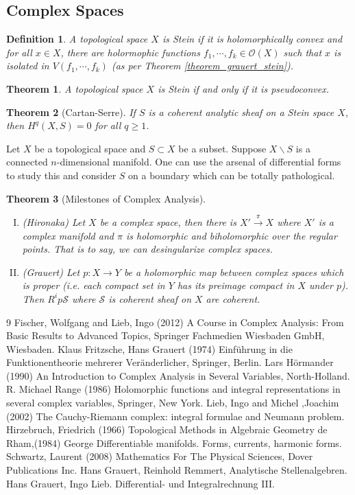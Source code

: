 \documentclass{article}
\newtheorem{theorem}{Theorem} [section]
\newtheorem{definition}{Definition}[section]
\newcommand{\Ouv}[0]{\mathcal{O}}
\begin{document}
    \subsection{Complex Spaces}
    \begin{definition}
      A topological space $X$ is Stein if it is holomorphically convex and for all $x\in X$, there are holormophic functions $f_1,\cdots,f_k\in\Ouv(X)$ such that $x$ is isolated in $V(f_1,\cdots,f_k)$ (as per Theorem \ref{theorem_grauert_stein}).
    \end{definition}
    \begin{theorem}
      A topological space $X$ is Stein if and only if it is pseudoconvex.
    \end{theorem}
    \begin{theorem}[Cartan-Serre]
      If $S$ is a coherent analytic sheaf on a Stein space $X$, then $H^q(X,S)=0$ for all $q\geq1$.
    \end{theorem}
    Let $X$ be a topological space and $S\subset X$ be a subset. Suppose $X\backslash S$ is a connected $n$-dimensional manifold. One can use the arsenal of differential forms to study this and consider $S$ on a boundary which can be totally pathological.
    \begin{theorem}[Milestones of Complex Analysis]$\:$
      \begin{enumerate}[I).]
        \item (Hironaka) Let $X$ be a complex space, then there is $X'\stackrel{\pi}{\to}X$ where $X'$ is a complex manifold and $\pi$ is holomorphic and biholomorphic over the regular points. That is to say, we can desingularize complex spaces.
        \item (Grauert) Let $p:X\to Y$ be a holomorphic map between complex spaces which is proper (i.e. each compact set in $Y$ has its preimage compact in $X$ under $p$). Then $R^ip\mathcal{S}$ where $\mathcal{S}$ is coherent sheaf on $X$ are coherent.
      \end{enumerate}
    \end{theorem} 
\begin{thebibliography}{9}
 Fischer, Wolfgang and Lieb, Ingo (2012) A Course in Complex Analysis: From Basic Results to Advanced Topics, Springer Fachmedien Wiesbaden GmbH, Wiesbaden.
 Klaus Fritzsche, Hans Grauert (1974) Einführung in die Funktionentheorie mehrerer Veränderlicher, Springer, Berlin.
Lars Hörmander (1990) An Introduction to Complex Analysis in Several Variables, North-Holland.
 R. Michael Range (1986) Holomorphic functions and integral representations in several complex variables, Springer, New York.
 Lieb, Ingo and Michel ,Joachim (2002) The Cauchy-Riemann complex: integral formulae and Neumann problem.
 Hirzebruch, Friedrich (1966) Topological Methods in Algebraic Geometry
 de Rham,(1984) George Differentiable manifolds. Forms, currents, harmonic forms.
 Schwartz, Laurent (2008) Mathematics For The Physical Sciences, Dover Publications Inc.
 Hans Grauert, Reinhold Remmert, Analytische Stellenalgebren.
 Hans Grauert, Ingo Lieb. Differential- und Integralrechnung III.
\end{thebibliography}
\end{document}
